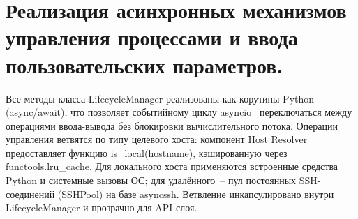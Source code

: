 
\section{Реализация асинхронных механизмов управления процессами и ввода пользовательских параметров.}



Все методы класса LifecycleManager реализованы как корутины Python (async/await), что позволяет событийному циклу asyncio~\cite{python-asyncio} переключаться между операциями ввода-вывода без блокировки вычислительного потока. Операции управления ветвятся по типу целевого хоста: компонент Host Resolver предоставляет функцию is\_local(hostname), кэшированную через functools.lru\_cache. Для локального хоста применяются встроенные средства Python и системные вызовы ОС; для удалённого~-- пул постоянных SSH-соединений (SSHPool) на базе asyncssh. Ветвление инкапсулировано внутри LifecycleManager и прозрачно для API-слоя.


